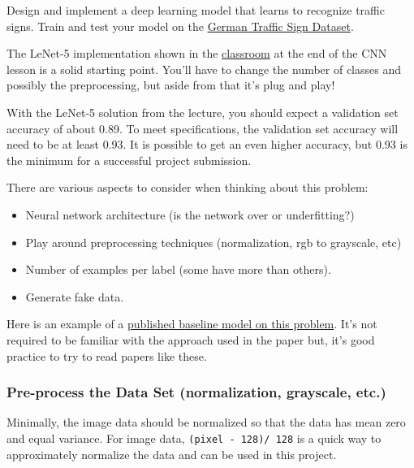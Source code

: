 \documentclass[11pt]{article}
\providecommand{\tightlist}{%
      \setlength{\itemsep}{0pt}\setlength{\parskip}{0pt}}
\begin{document}
Design and implement a deep learning model that learns to recognize
traffic signs. Train and test your model on the
\href{http://benchmark.ini.rub.de/?section=gtsrb\&subsection=dataset}{German
Traffic Sign Dataset}.

The LeNet-5 implementation shown in the
\href{https://classroom.udacity.com/nanodegrees/nd013/parts/fbf77062-5703-404e-b60c-95b78b2f3f9e/modules/6df7ae49-c61c-4bb2-a23e-6527e69209ec/lessons/601ae704-1035-4287-8b11-e2c2716217ad/concepts/d4aca031-508f-4e0b-b493-e7b706120f81}{classroom}
at the end of the CNN lesson is a solid starting point. You'll have to
change the number of classes and possibly the preprocessing, but aside
from that it's plug and play!

With the LeNet-5 solution from the lecture, you should expect a
validation set accuracy of about 0.89. To meet specifications, the
validation set accuracy will need to be at least 0.93. It is possible to
get an even higher accuracy, but 0.93 is the minimum for a successful
project submission.

There are various aspects to consider when thinking about this problem:

\begin{itemize}
\tightlist
\item
  Neural network architecture (is the network over or underfitting?)
\item
  Play around preprocessing techniques (normalization, rgb to grayscale,
  etc)
\item
  Number of examples per label (some have more than others).
\item
  Generate fake data.
\end{itemize}

Here is an example of a
\href{http://yann.lecun.com/exdb/publis/pdf/sermanet-ijcnn-11.pdf}{published
baseline model on this problem}. It's not required to be familiar with
the approach used in the paper but, it's good practice to try to read
papers like these.

    \subsubsection{Pre-process the Data Set (normalization, grayscale,
etc.)}\label{pre-process-the-data-set-normalization-grayscale-etc.}

    Minimally, the image data should be normalized so that the data has mean
zero and equal variance. For image data, \texttt{(pixel\ -\ 128)/\ 128}
is a quick way to approximately normalize the data and can be used in
this project.
\end{document}
